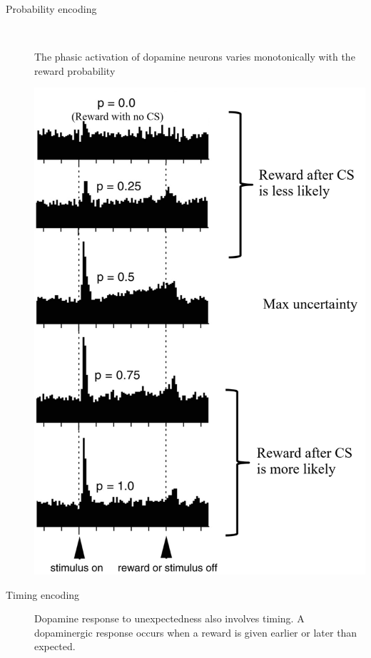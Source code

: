 \begin{description}
\begin{@empty}
\begin{example}
\begin{minipage}{0.28\linewidth}
                \end{minipage}
            \end{example}
        \end{@empty}

    \item[Probability encoding] 
        \phantom{} \\
        \begin{minipage}{0.45\linewidth}
            The phasic activation of dopamine neurons varies monotonically with the reward probability
        \end{minipage}
        \begin{minipage}{0.5\linewidth}
            \centering
            \includegraphics[width=0.85\linewidth]{./img/dopamine_probability.png}
        \end{minipage}

    \item[Timing encoding] 
        Dopamine response to unexpectedness also involves timing.
        A dopaminergic response occurs when a reward is given earlier or later than expected.


\end{description}
